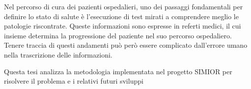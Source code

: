 \vspace{4cm}
Nel percorso di cura dei pazienti ospedalieri, uno dei passaggi fondamentali per definire lo stato di salute è l'esecuzione di test mirati a comprendere meglio le patologie riscontrate.
Queste informazioni sono espresse in referti medici, il cui insieme determina la progressione del paziente nel suo percorso ospedaliero.
Tenere traccia di questi andamenti può però essere complicato dall'errore umano nella trascrizione delle informazioni.
\par\bigskip
Questa tesi analizza la metodologia implementata nel progetto SIMIOR per risolvere il problema e i relativi futuri sviluppi
\textit{}